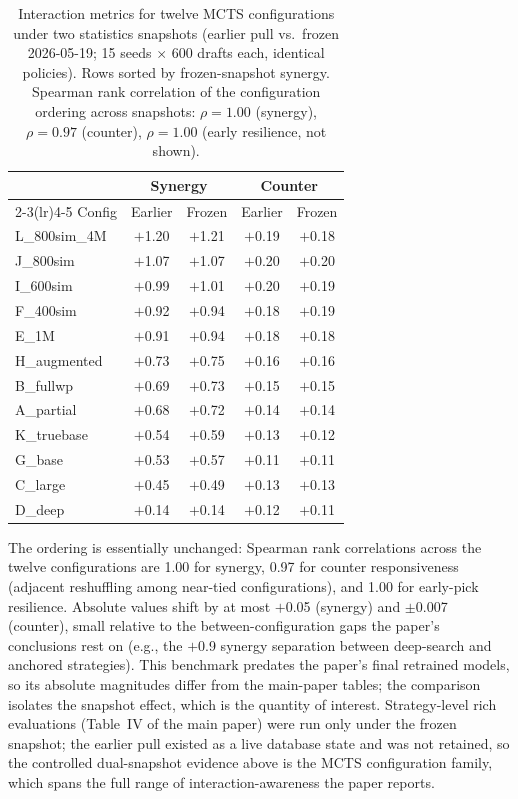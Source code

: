 \documentclass[journal]{IEEEtran}
\begin{document}
\begin{table}[t]
\centering
\caption{Interaction metrics for twelve MCTS configurations under two statistics snapshots (earlier pull vs.\ frozen 2026-05-19; 15 seeds $\times$ 600 drafts each, identical policies). Rows sorted by frozen-snapshot synergy. Spearman rank correlation of the configuration ordering across snapshots: $\rho = 1.00$ (synergy), $\rho = 0.97$ (counter), $\rho = 1.00$ (early resilience, not shown).}
\label{tab:dualsnap}
\begin{tabular}{lcccc}
\toprule
& \multicolumn{2}{c}{Synergy} & \multicolumn{2}{c}{Counter} \\
\cmidrule(lr){2-3}\cmidrule(lr){4-5}
Config & Earlier & Frozen & Earlier & Frozen \\
\midrule
L\_800sim\_4M & $+$1.20 & $+$1.21 & $+$0.19 & $+$0.18 \\
J\_800sim & $+$1.07 & $+$1.07 & $+$0.20 & $+$0.20 \\
I\_600sim & $+$0.99 & $+$1.01 & $+$0.20 & $+$0.19 \\
F\_400sim & $+$0.92 & $+$0.94 & $+$0.18 & $+$0.19 \\
E\_1M & $+$0.91 & $+$0.94 & $+$0.18 & $+$0.18 \\
H\_augmented & $+$0.73 & $+$0.75 & $+$0.16 & $+$0.16 \\
B\_fullwp & $+$0.69 & $+$0.73 & $+$0.15 & $+$0.15 \\
A\_partial & $+$0.68 & $+$0.72 & $+$0.14 & $+$0.14 \\
K\_truebase & $+$0.54 & $+$0.59 & $+$0.13 & $+$0.12 \\
G\_base & $+$0.53 & $+$0.57 & $+$0.11 & $+$0.11 \\
C\_large & $+$0.45 & $+$0.49 & $+$0.13 & $+$0.13 \\
D\_deep & $+$0.14 & $+$0.14 & $+$0.12 & $+$0.11 \\
\bottomrule
\end{tabular}
\end{table}

The ordering is essentially unchanged: Spearman rank correlations across the twelve configurations are 1.00 for synergy, 0.97 for counter responsiveness (adjacent reshuffling among near-tied configurations), and 1.00 for early-pick resilience. Absolute values shift by at most $+$0.05 (synergy) and $\pm$0.007 (counter), small relative to the between-configuration gaps the paper's conclusions rest on (e.g., the $+$0.9 synergy separation between deep-search and anchored strategies). This benchmark predates the paper's final retrained models, so its absolute magnitudes differ from the main-paper tables; the comparison isolates the snapshot effect, which is the quantity of interest. Strategy-level rich evaluations (Table~IV of the main paper) were run only under the frozen snapshot; the earlier pull existed as a live database state and was not retained, so the controlled dual-snapshot evidence above is the MCTS configuration family, which spans the full range of interaction-awareness the paper reports.
\end{document}
